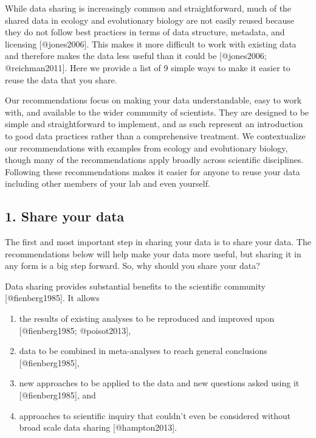 While data sharing is increasingly common and straightforward, much of
the shared data in ecology and evolutionary biology are not easily
reused because they do not follow best practices in terms of data
structure, metadata, and licensing {[}@jones2006{]}. This makes it more
difficult to work with existing data and therefore makes the data less
useful than it could be {[}@jones2006; @reichman2011{]}. Here we provide
a list of 9 simple ways to make it easier to reuse the data that you
share.

Our recommendations focus on making your data understandable, easy to
work with, and available to the wider community of scientists. They are
designed to be simple and straightforward to implement, and as such
represent an introduction to good data practices rather than a
comprehensive treatment. We contextualize our recommendations with
examples from ecology and evolutionary biology, though many of the
recommendations apply broadly across scientific disciplines. Following
these recommendations makes it easier for anyone to reuse your data
including other members of your lab and even yourself.

\subsection{1. Share your data}\label{share-your-data}

The first and most important step in sharing your data is to share your
data. The recommendations below will help make your data more useful,
but sharing it in any form is a big step forward. So, why should you
share your data?

Data sharing provides substantial benefits to the scientific community
{[}@fienberg1985{]}. It allows

\begin{enumerate}
\def\labelenumi{\arabic{enumi}.}
\itemsep1pt\parskip0pt
\item
  the results of existing analyses to be reproduced and improved upon
  {[}@fienberg1985; @poisot2013{]},
\item
  data to be combined in meta-analyses to reach general conclusions
  {[}@fienberg1985{]},
\item
  new approaches to be applied to the data and new questions asked using
  it {[}@fienberg1985{]}, and
\item
  approaches to scientific inquiry that couldn't even be considered
  without broad scale data sharing {[}@hampton2013{]}.
\end{enumerate}

